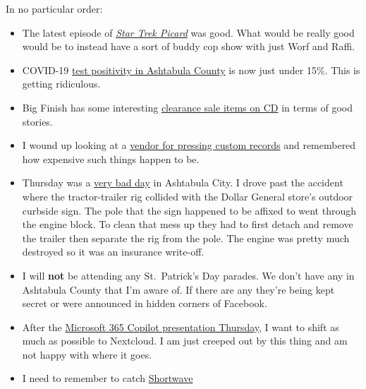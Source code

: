 In no particular order:

\begin{itemize}
\tightlist
\item
  The latest episode of
  \href{https://www.paramountplus.com/shows/star-trek-picard/}{\emph{Star
  Trek Picard}} was good. What would be really good would be to instead
  have a sort of buddy cop show with just Worf and Raffi.\\
\item
  COVID-19
  \href{https://covid.cdc.gov/covid-data-tracker/\#county-view?list_select_state=Ohio&data-type=CommunityLevels&list_select_county=39007}{test
  positivity in Ashtabula County} is now just under 15\%. This is
  getting ridiculous.
\item
  Big Finish has some interesting
  \href{https://www.bigfinish.com/collections/v/last-chance-on-cd?sort_ordering=price_asc&search_product_type=&search_availability=all}{clearance
  sale items on CD} in terms of good stories.
\item
  I wound up looking at a
  \href{https://www.gottagrooverecords.com/home/ggr-record-builder/}{vendor
  for pressing custom records} and remembered how expensive such things
  happen to be.
\item
  Thursday was a
  \href{https://www.starbeacon.com/news/ashtabula-emergency-workers-busy-on-thursday-afternoon/article_9864c008-c436-11ed-a6dc-2fe459576e8a.html}{very
  bad day} in Ashtabula City. I drove past the accident where the
  tractor-trailer rig collided with the Dollar General store's outdoor
  curbside sign. The pole that the sign happened to be affixed to went
  through the engine block. To clean that mess up they had to first
  detach and remove the trailer then separate the rig from the pole. The
  engine was pretty much destroyed so it was an insurance write-off.
\item
  I will \textbf{not} be attending any St.~Patrick's Day parades. We
  don't have any in Ashtabula County that I'm aware of. If there are any
  they're being kept secret or were announced in hidden corners of
  Facebook.
\item
  After the
  \href{https://blogs.microsoft.com/blog/2023/03/16/introducing-microsoft-365-copilot-your-copilot-for-work/}{Microsoft
  365 Copilot presentation Thursday}, I want to shift as much as
  possible to Nextcloud. I am just creeped out by this thing and am not
  happy with where it goes.
\item
  I need to remember to catch \href{https://swradiogram.net/}{Shortwave
}
\end{itemize}
